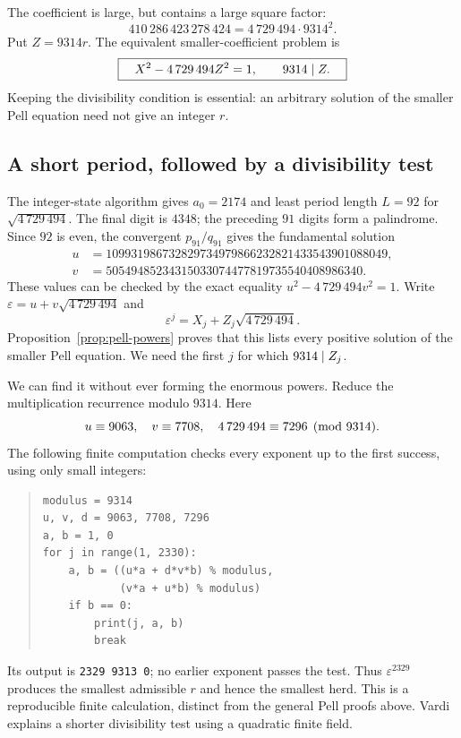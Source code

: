 The coefficient is large, but contains a large square factor:
\[
 410\,286\,423\,278\,424=4\,729\,494\cdot9314^2.
\]
Put $Z=9314r$. The equivalent smaller-coefficient problem is
\begin{equation}\label{eq:cattle-small-pell}
 \boxed{\quad X^2-4\,729\,494Z^2=1,
 \qquad 9314\mid Z.\quad}
\end{equation}
Keeping the divisibility condition is essential: an arbitrary solution
of the smaller Pell equation need not give an integer $r$.

\subsection*{A short period, followed by a divisibility test}
The integer-state algorithm gives $a_0=2174$ and least period length
$L=92$ for $\sqrt{4\,729\,494}$. The final digit is $4348$; the preceding
$91$ digits form a palindrome. Since $92$ is even, the convergent
$p_{91}/q_{91}$ gives the fundamental solution
\begin{align*}
 u&=109931986732829734979866232821433543901088049,\\
 v&=50549485234315033074477819735540408986340.
\end{align*}
These values can be checked by the exact equality
$u^2-4\,729\,494v^2=1$. Write
$\varepsilon=u+v\sqrt{4\,729\,494}$ and
\[
 \varepsilon^j=X_j+Z_j\sqrt{4\,729\,494}.
\]
Proposition~\ref{prop:pell-powers} proves that this lists every positive
solution of the smaller Pell equation. We need the first $j$ for which
$9314\mid Z_j$.

We can find it without ever forming the enormous powers. Reduce the
multiplication recurrence modulo $9314$. Here
\[
 u\equiv9063,\quad v\equiv7708,\quad
 4\,729\,494\equiv7296\pmod{9314}.
\]
The following finite computation checks every exponent up to the first
success, using only small integers:
\begin{quote}\begin{minipage}{\linewidth}\small
\begin{verbatim}
modulus = 9314
u, v, d = 9063, 7708, 7296
a, b = 1, 0
for j in range(1, 2330):
    a, b = ((u*a + d*v*b) % modulus,
            (v*a + u*b) % modulus)
    if b == 0:
        print(j, a, b)
        break
\end{verbatim}
\end{minipage}\end{quote}
Its output is \texttt{2329 9313 0}; no earlier exponent passes the test.
Thus $\varepsilon^{2329}$ produces the smallest admissible $r$ and
hence the smallest herd. This is a reproducible finite calculation,
distinct from the general Pell proofs above. Vardi explains a shorter
divisibility test using a quadratic finite field.

